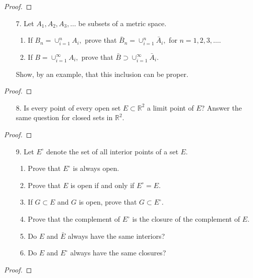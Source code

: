 \documentclass[10pt]{article}
\theoremstyle{definition}
\theoremstyle{plain}
\newcommand{\R}{\mathbb{R}}
\begin{document}
\begin{proof}

\end{proof}



\pagebreak



\begin{enumerate}
\item[7.] Let $A_1,A_2,A_3,\dots$ be subsets of a metric space.
\begin{enumerate}
  \item If $B_n = \cup_{i=1}^{n} A_i,$ prove that $\bar{B}_n = \cup_{i=1}^{n} \bar{A}_i,$ for $n=1,2,3,\dots$.
  \item If $B = \cup_{i=1}^{\infty} A_i,$ prove that $\bar{B} \supset \cup_{i=1}^{\infty} \bar{A}_i.$
\end{enumerate}
Show, by an example, that this inclusion can be proper.
\end{enumerate}

\begin{proof}

\end{proof}



\pagebreak



\begin{enumerate}
\item[8.] Is every point of every open set $E \subset \R^2$ a limit point of $E$? Answer the same question for closed sets in $\R^2$.
\end{enumerate}

\begin{proof}

\end{proof}




\pagebreak




\begin{enumerate}
\item[9.] Let $E^\circ$ denote the set of all interior points of a set $E$.
\begin{enumerate}
  \item Prove that $E^\circ$ is always open.
  \item Prove that $E$ is open if and only if $E^\circ = E$.
  \item If $G \subset E$ and $G$ is open, prove that $G\subset E^\circ$.
  \item Prove that the complement of $E^\circ$ is the closure of the complement of $E$.
  \item Do $E$ and $\bar{E}$ always have the same interiors?
  \item Do $E$ and $E^\circ$ always have the same closures?
\end{enumerate}
\end{enumerate}

\begin{proof}

\end{proof}
\end{document}
